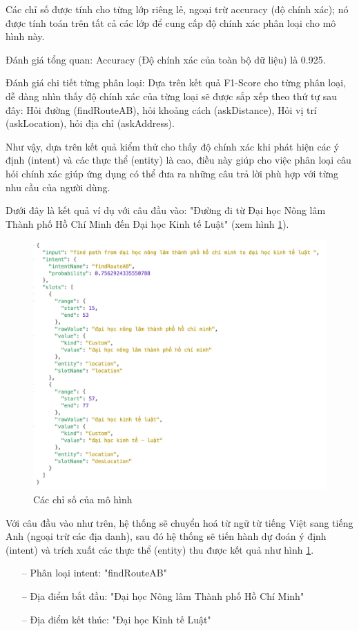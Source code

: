 Các chỉ số được tính cho từng lớp riêng lẻ, ngoại trừ accuracy (độ chính xác); nó được tính toán trên tất cả các lớp để cung cấp độ chính xác phân loại cho mô hình này.

Đánh giá tổng quan: Accuracy (Độ chính xác của toàn bộ dữ liệu) là 0.925.

Đánh giá chi tiết từng phân loại: Dựa trên kết quả F1-Score cho từng phân loại, dễ dàng nhìn thấy độ chính xác của từng loại sẽ được sắp xếp theo thứ tự sau đây: Hỏi đường (findRouteAB), hỏi khoảng cách (askDistance), Hỏi vị trí (askLocation), hỏi địa chỉ (askAddress).

Như vậy, dựa trên kết quả kiểm thử cho thấy độ chính xác khi phát hiện các ý định (intent) và các thực thể (entity) là cao, điều này giúp cho việc phân loại câu hỏi chính xác giúp ứng dụng có thể đưa ra những câu trả lời phù hợp với từng nhu cầu của người dùng.

Dưới đây là kết quả ví dụ với câu đầu vào: "Đường đi từ Đại học Nông lâm Thành phố Hồ Chí Minh đến Đại học Kinh tế Luật" (xem hình \ref{fig:detect-intent}).

\begin{figure}[htp]
    \centering
    \includegraphics[width=15cm]{images/detect_intent.jpg}
    \caption{Các chỉ số của mô hình}
    \label{fig:detect-intent}
\end{figure}

Với câu đầu vào như trên, hệ thống sẽ chuyển hoá từ ngữ từ tiếng Việt sang tiếng Anh (ngoại trừ các địa danh), sau đó hệ thống sẽ tiến hành dự đoán ý định (intent) và trích xuất các thực thể (entity) thu được kết quả như hình \ref{fig:detect-intent}.
\begin{itemize}
    \item[--] Phân loại intent: "findRouteAB"
    \item[--] Địa điểm bắt đầu: "Đại học Nông lâm Thành phố Hồ Chí Minh"
    \item[--] Địa điểm kết thúc: "Đại học Kinh tế Luật"
\end{itemize}

